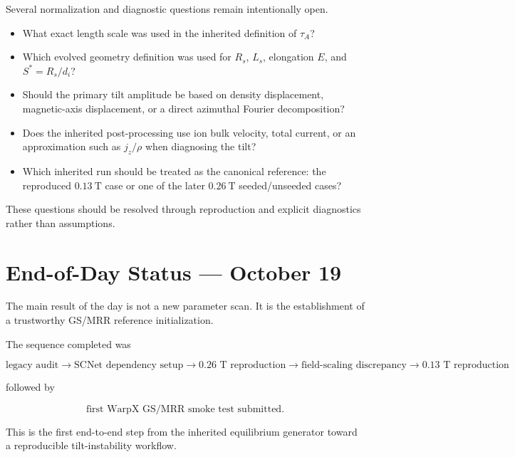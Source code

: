 \documentclass[11pt,a4paper]{article}
\begin{document}
Several normalization and diagnostic questions remain intentionally open.

\begin{itemize}
    \item What exact length scale was used in the inherited definition of
    \(\tau_A\)?

    \item Which evolved geometry definition was used for \(R_s\), \(L_s\),
    elongation \(E\), and \(S^*=R_s/d_i\)?

    \item Should the primary tilt amplitude be based on density displacement,
    magnetic-axis displacement, or a direct azimuthal Fourier decomposition?

    \item Does the inherited post-processing use ion bulk velocity, total
    current, or an approximation such as \(j_z/\rho\) when diagnosing the tilt?

    \item Which inherited run should be treated as the canonical reference:
    the reproduced \(0.13~\mathrm{T}\) case or one of the later
    \(0.26~\mathrm{T}\) seeded/unseeded cases?
\end{itemize}

These questions should be resolved through reproduction and explicit
diagnostics rather than assumptions.

\section{End-of-Day Status --- October 19}

The main result of the day is not a new parameter scan. It is the establishment
of a trustworthy GS/MRR reference initialization.

The sequence completed was

\[
\boxed{
\text{legacy audit}
\rightarrow
\text{SCNet dependency setup}
\rightarrow
\text{0.26 T reproduction}
\rightarrow
\text{field-scaling discrepancy}
\rightarrow
\text{0.13 T reproduction}
}
\]

followed by

\[
\boxed{
\text{first WarpX GS/MRR smoke test submitted}.
}
\]

This is the first end-to-end step from the inherited equilibrium generator
toward a reproducible tilt-instability workflow.

\end{document}
